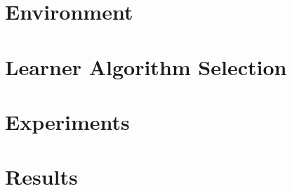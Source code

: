 \section{Environment}

\section{Learner Algorithm Selection}

\section{Experiments}

\section{Results}


